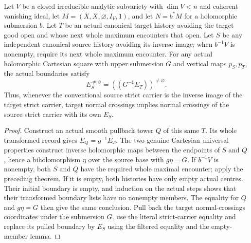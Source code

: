 \begin{theorem}
\label{hir:original-independent-stopped-own-boundary}
\leanok
Let $V$ be a closed irreducible analytic subvariety with $\dim V<n$
and coherent vanishing ideal, let $M=(X,X,\varnothing,I_V,1)$, and let
$N=b^*M$ for a holomorphic submersion $b$.  Let $T$ be an actual
canonical target history avoiding the target good open and whose next
whole maximum encounters that open.  Let $S$ be
any independent canonical source history avoiding its inverse image;
when $b^{-1}V$ is nonempty, require its next whole maximum encounter.
For any actual holomorphic Cartesian square with upper submersion $G$
and vertical maps $p_S,p_T$, the actual boundaries satisfy
\[
 E_S^{\ne\varnothing}
  =((G^{-1}E_T))^{\ne\varnothing}.
\]
Thus, whenever the conventional source strict carrier is the inverse
image of the target strict carrier, target normal crossings implies
normal crossings of the source strict carrier with its own $E_S$.
\end{theorem}
\begin{proof}
Construct an actual smooth pullback tower $Q$ of this same $T$.  Its
whole transformed record gives $E_Q=g^{-1}E_T$.  The two genuine
Cartesian universal properties construct inverse holomorphic maps
between the endpoints of $S$ and $Q$, hence a biholomorphism $\eta$
over the source base with $g\eta=G$.  If $b^{-1}V$ is nonempty, both
$S$ and $Q$ have the required whole maximal encounter; apply the
preceding theorem.  If it is empty, both histories have only empty
actual centres.  Their initial boundary is empty, and induction on the
actual steps shows that their transformed boundary lists have no
nonempty members.  The equality for $Q$ and $g\eta=G$ then give the
same conclusion.  Pull back the target normal-crossings coordinates
under the submersion $G$, use the literal strict-carrier equality and
replace its pulled boundary by $E_S$ using the filtered equality and
the empty-member lemma.
\end{proof}


